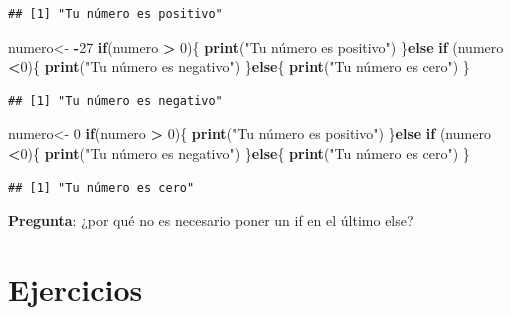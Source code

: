 \documentclass[
]{book}
\newenvironment{Shaded}{\begin{snugshade}}{\end{snugshade}}
\newcommand{\ControlFlowTok}[1]{\textcolor[rgb]{0.13,0.29,0.53}{\textbf{#1}}}
\newcommand{\DecValTok}[1]{\textcolor[rgb]{0.00,0.00,0.81}{#1}}
\newcommand{\FunctionTok}[1]{\textcolor[rgb]{0.13,0.29,0.53}{\textbf{#1}}}
\newcommand{\NormalTok}[1]{#1}
\newcommand{\OtherTok}[1]{\textcolor[rgb]{0.56,0.35,0.01}{#1}}
\newcommand{\SpecialCharTok}[1]{\textcolor[rgb]{0.81,0.36,0.00}{\textbf{#1}}}
\newcommand{\StringTok}[1]{\textcolor[rgb]{0.31,0.60,0.02}{#1}}
\begin{document}
\begin{verbatim}
## [1] "Tu número es positivo"
\end{verbatim}

\begin{Shaded}
\begin{Highlighting}[]
\NormalTok{numero}\OtherTok{\textless{}{-}} \SpecialCharTok{{-}}\DecValTok{27}
\ControlFlowTok{if}\NormalTok{(numero }\SpecialCharTok{\textgreater{}} \DecValTok{0}\NormalTok{)\{}
  \FunctionTok{print}\NormalTok{(}\StringTok{"Tu número es positivo"}\NormalTok{)}
\NormalTok{\}}\ControlFlowTok{else} \ControlFlowTok{if}\NormalTok{ (numero }\SpecialCharTok{\textless{}}\DecValTok{0}\NormalTok{)\{}
  \FunctionTok{print}\NormalTok{(}\StringTok{"Tu número es negativo"}\NormalTok{)}
\NormalTok{\}}\ControlFlowTok{else}\NormalTok{\{}
  \FunctionTok{print}\NormalTok{(}\StringTok{"Tu número es cero"}\NormalTok{)}
\NormalTok{\}}
\end{Highlighting}
\end{Shaded}

\begin{verbatim}
## [1] "Tu número es negativo"
\end{verbatim}

\begin{Shaded}
\begin{Highlighting}[]
\NormalTok{numero}\OtherTok{\textless{}{-}} \DecValTok{0}
\ControlFlowTok{if}\NormalTok{(numero }\SpecialCharTok{\textgreater{}} \DecValTok{0}\NormalTok{)\{}
  \FunctionTok{print}\NormalTok{(}\StringTok{"Tu número es positivo"}\NormalTok{)}
\NormalTok{\}}\ControlFlowTok{else} \ControlFlowTok{if}\NormalTok{ (numero }\SpecialCharTok{\textless{}}\DecValTok{0}\NormalTok{)\{}
  \FunctionTok{print}\NormalTok{(}\StringTok{"Tu número es negativo"}\NormalTok{)}
\NormalTok{\}}\ControlFlowTok{else}\NormalTok{\{}
  \FunctionTok{print}\NormalTok{(}\StringTok{"Tu número es cero"}\NormalTok{)}
\NormalTok{\}}
\end{Highlighting}
\end{Shaded}

\begin{verbatim}
## [1] "Tu número es cero"
\end{verbatim}

\textbf{Pregunta}: ¿por qué no es necesario poner un if en el último else?

\section{Ejercicios}\label{ejercicios-4}
\end{document}
